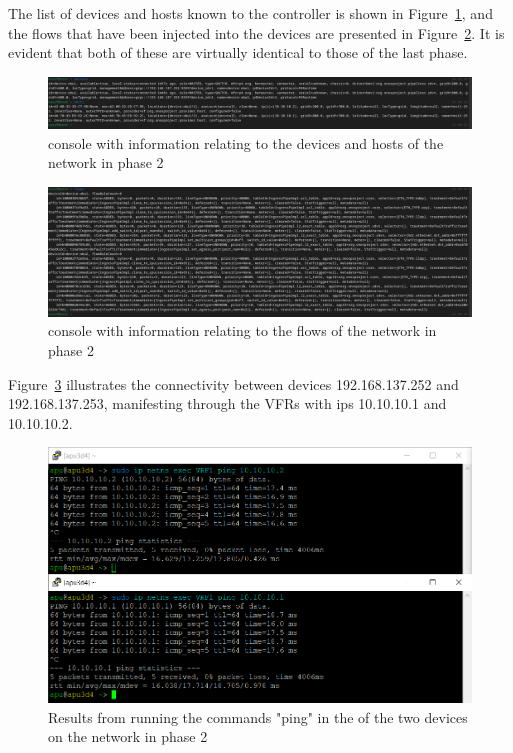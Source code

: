 The list of devices and hosts known to the controller is shown in Figure~\ref{fig:exp2_phase2_onos}, and the flows that have been injected into the devices are presented in Figure~\ref{fig:exp2_phase2_onos_flows}. It is evident that both of these are virtually identical to those of the last phase.

\begin{figure}
	\centering
	\includegraphics[width=\textwidth]{Chapters/Figures/tests/bmv2_phase_2/onos_topology.PNG}
	\caption{ console with information relating to the devices and hosts of the network in phase 2}
	\label{fig:exp2_phase2_onos}
\end{figure}

\begin{figure}
	\centering
	\includegraphics[width=\textwidth]{Chapters/Figures/tests/bmv2_phase_2/onos_flows.PNG}
	\caption{ console with information relating to the flows of the network in phase 2}
	\label{fig:exp2_phase2_onos_flows}
\end{figure}

Figure~\ref{fig:exp2_phase2_pings} illustrates the connectivity between devices 192.168.137.252 and 192.168.137.253, manifesting through the VFRs with \glspl{ip} 10.10.10.1 and 10.10.10.2.

\begin{figure}
	\centering
	\includegraphics[width=\textwidth]{Chapters/Figures/tests/bmv2_phase_2/pings.PNG}
	\caption{Results from running the commands "ping" in the  of the two devices on the network in phase 2}
	\label{fig:exp2_phase2_pings}
\end{figure}

